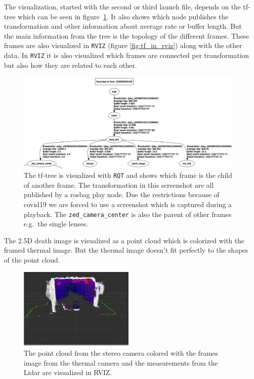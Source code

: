 The visualization, started with the second or third launch file, depends on the tf-tree which can be seen in figure~\ref{fig:tf_tree}.
It also shows which node publishes the transformation and other information about average rate or buffer length.
But the main information from the tree is the topology of the different frames.
These frames are also visualized in \texttt{RVIZ} (figure \ref{fig:tf_in_rviz}) along with the other data.
In \texttt{RVIZ} it is also visualized which frames are connected per transformation but also how they are related to each other.

\begin{figure}[!ht]
    \centering
    \includegraphics[width=\textwidth]{img/results/tf-tree.png}
    \caption{The tf-tree is visualized with \texttt{RQT} and shows which frame is the child of another frame. The transformation in this screenshot are all published by a rosbag play node. Due the restrictions because of covid19 we are forced to use a screenshot which is captured during a playback. The \texttt{zed\_camera\_center} is also the parent of other frames e.g.~the single lenses.}
    \label{fig:tf_tree}
\end{figure}

The 2.5D death image is visualized as a point cloud which is colorized with the framed thermal image.
But the thermal image doesn't fit perfectly to the shapes of the point cloud.

\begin{figure}
    \centering
    \includegraphics[width=0.5\textwidth]{img/results/rviz.png}
    \caption{The point cloud from the stereo camera colored with the frames image from the thermal camera and the measurements from the Lidar are visualized in RVIZ.}
    \label{fig:rviz}
\end{figure}

